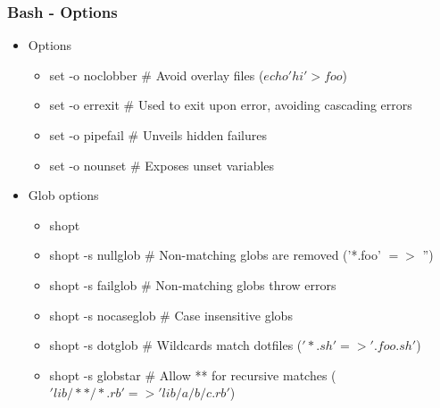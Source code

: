 \subsubsection{Bash - Options}
\begin{frame}[fragile]{\subsubsecname}
  \begin{itemize}
    \item Options
    \begin{itemize}
      \item set -o noclobber \# Avoid overlay files ($echo 'hi' > foo$)
      \item set -o errexit \# Used to exit upon error, avoiding cascading errors
      \item set -o pipefail \# Unveils hidden failures
      \item set -o nounset \# Exposes unset variables
    \end{itemize}
    \item Glob options
    \begin{itemize}
      \item shopt
      \item shopt -s nullglob \# Non-matching globs are removed  ('*.foo' $=>$ '')
      \item shopt -s failglob \# Non-matching globs throw errors
      \item shopt -s nocaseglob \# Case insensitive globs
      \item shopt -s dotglob \# Wildcards match dotfiles ($'{}*.sh' => '.foo.sh'$)
      \item shopt -s globstar \# Allow ** for recursive matches ($'lib/**/*.rb' => 'lib/a/b/c.rb'$)
    \end{itemize}
  \end{itemize}
\end{frame}
